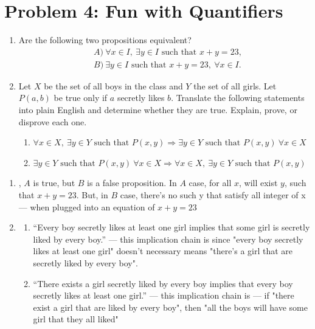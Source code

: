 \section*{Problem 4: Fun with Quantifiers}
\begin{enumerate}
    \item[4.1)] Are the following two propositions equivalent?
    \begin{align*}
        &A)~\forall x \in I,\ \exists y \in I \text{ such that } x + y = 23, \\
        &B)~\exists y \in I \text{ such that } x + y = 23,\ \forall x \in I.
    \end{align*}
    \item[4.2)] Let $X$ be the set of all boys in the class and $Y$ the set of all girls. Let $P(a,b)$ be true only if $a$ secretly likes $b$. Translate the following statements into plain English and determine whether they are true. Explain, prove, or disprove each one.
    \begin{enumerate}
        \item[(A)] $\forall x \in X,\ \exists y \in Y \text{ such that } P(x,y) \Rightarrow \exists y \in Y \text{ such that } P(x,y)\ \forall x \in X$
        \item[(B)] $\exists y \in Y \text{ such that } P(x,y)\ \forall x \in X \Rightarrow \forall x \in X,\ \exists y \in Y \text{ such that } P(x,y)$
    \end{enumerate}
\end{enumerate}

\medskip
\solution

\begin{enumerate}
    \item[4.1)] , $A$ is true, but $B$ is a false proposition. In $A$ case, for all $x$, will exist $y$, such that $x + y = 23$. But, in $B$ case, there's no such y that satisfy all integer of x --- when plugged into an equation of $x + y = 23$
    \item[4.2)] 
          \begin{enumerate}
              \item[(A)] “Every boy secretly likes at least one girl implies that some girl is secretly liked by every boy.” --- this implication chain is  since "every boy secretly likes at least one girl" doesn't necessary means "there's a girl that are secretly liked by every boy".
              \item[(B)] “There exists a girl secretly liked by every boy implies that every boy secretly likes at least one girl.” --- this implication chain is  --- if "there exist a girl that are liked by every boy", then "all the boys will have some girl that they all liked"
          \end{enumerate}
\end{enumerate}

\vspace{1em}
\hrulefill


